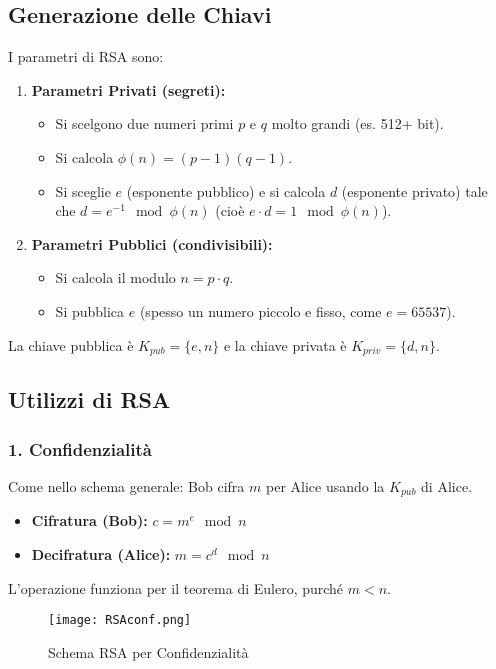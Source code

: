 \documentclass[../main.tex]{subfiles}
\begin{document}
\subsection{Generazione delle Chiavi}
I parametri di RSA sono:
\begin{enumerate}
    \item \textbf{Parametri Privati (segreti):}
          \begin{itemize}
              \item Si scelgono due numeri primi $p$ e $q$ molto grandi (es. 512+ bit).
              \item Si calcola $\phi(n) = (p-1)(q-1)$.
              \item Si sceglie $e$ (esponente pubblico) e si calcola $d$ (esponente privato) tale che $d = e^{-1} \mod \phi(n)$ (cioè $e \cdot d = 1 \mod \phi(n)$).
          \end{itemize}
    \item \textbf{Parametri Pubblici (condivisibili):}
          \begin{itemize}
              \item Si calcola il modulo $n = p \cdot q$.
              \item Si pubblica $e$ (spesso un numero piccolo e fisso, come $e=65537$).
          \end{itemize}
\end{enumerate}
La chiave pubblica è $K_{pub} = \{e, n\}$ e la chiave privata è $K_{priv} = \{d, n\}$.

\subsection{Utilizzi di RSA}

\subsubsection{1. Confidenzialità}
Come nello schema generale: Bob cifra $m$ per Alice usando la $K_{pub}$ di Alice.
\begin{itemize}
    \item \textbf{Cifratura (Bob):} $c = m^e \mod n$
    \item \textbf{Decifratura (Alice):} $m = c^d \mod n$
\end{itemize}
L'operazione funziona per il teorema di Eulero, purché $m < n$.

\begin{figure}[H]
  \centering
  \texttt{[image: RSAconf.png]}
  \caption{Schema RSA per Confidenzialità}
  \label{fig:}
\end{figure}
\end{document}
